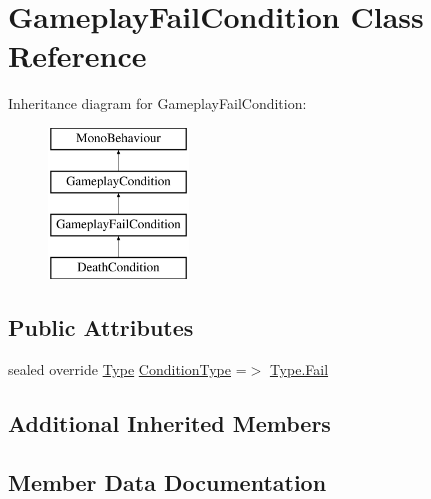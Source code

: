 \hypertarget{class_gameplay_fail_condition}{}\section{Gameplay\+Fail\+Condition Class Reference}
\label{class_gameplay_fail_condition}
Inheritance diagram for Gameplay\+Fail\+Condition\+:\begin{figure}[H]
\begin{center}
\leavevmode
\includegraphics[height=4.000000cm]{class_gameplay_fail_condition}
\end{center}
\end{figure}
\subsection*{Public Attributes}
\begin{DoxyCompactItemize}
\item 
sealed override \mbox{\hyperlink{class_gameplay_condition_af7549fe9ce5328062dab831d05ca9702}{Type}} \mbox{\hyperlink{class_gameplay_fail_condition_a6167e5dadde8e13435a22c78a80a75a8}{Condition\+Type}} =$>$ \mbox{\hyperlink{class_gameplay_condition_af7549fe9ce5328062dab831d05ca9702aceaa0734f0b3c738120c67344d8f3ec1}{Type.\+Fail}}
\end{DoxyCompactItemize}
\subsection*{Additional Inherited Members}


\subsection{Member Data Documentation}
\mbox{\label{class_gameplay_fail_condition_a6167e5dadde8e13435a22c78a80a75a8}} 
